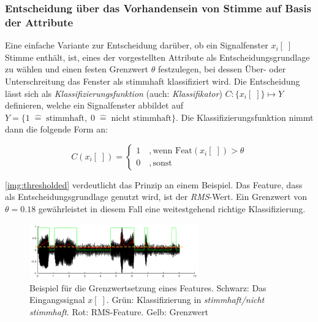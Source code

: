 \subsubsection{Entscheidung über das Vorhandensein von Stimme auf Basis der Attribute}

Eine einfache Variante zur Entscheidung darüber, ob ein Signalfenster $x_i[\;]$ Stimme enthält, ist, eines der vorgestellten Attribute als Entscheidungsgrundlage zu wählen und einen festen Grenzwert $\theta$ festzulegen, bei dessen Über- oder Unterschreitung das Fenster als stimmhaft klassifiziert wird. Die Entscheidung lässt sich als \emph{Klassifizierungsfunktion} (auch: \emph{Klassifikator}) $C: \{ x_i[\;] \} \mapsto Y$ definieren, welche ein Signalfenster abbildet auf $Y = \{ 1 \; \hat{=} \; \text{stimmhaft}, \; 0 \; \hat{=} \; \text{nicht stimmhaft}\}$. Die Klassifizierungsfunktion nimmt dann die folgende Form an:

\begin{equation}
	C(x_i[\;]) = 
\begin{cases}
1 \quad , \text{wenn Feat}(x_i[\;]) > \theta \\
0 \quad , \text{sonst}
 \end{cases}
\end{equation}

\autoref{img:thresholded} verdeutlicht das Prinzip an einem Beispiel. Das Feature, dass als Entscheidungsgrundlage genutzt wird, ist der \emph{RMS}-Wert. Ein Grenzwert von $\theta = 0.18$ gewährleistet in diesem Fall eine weitestgehend richtige Klassifizierung.

\begin{figure}[h]
	\centering
	\includegraphics[width=0.65\textwidth]{bilder/thresholded02.png}
	\caption[Beispiel für die Grenzwertsetzung eines Features]{Beispiel für die Grenzwertsetzung eines Features. Schwarz: Das Eingangssignal $x[\;]$. Grün: Klassifizierung in \emph{stimmhaft/nicht stimmhaft}. Rot: RMS-Feature. Gelb: Grenzwert}
	\label{img:thresholded}
\end{figure}

